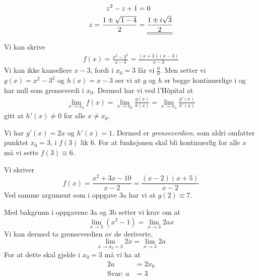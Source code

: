 \documentclass[a4paper,norsk,12pt]{article}
\begin{document}
\begin{equation*}
\begin{split}
  z^2 - z + 1 & = 0 \\
  z = \frac{1 \pm \sqrt{1-4}}{2}
  & = {\underline{\underline{\frac{1 \pm i\sqrt{3}}{2}}}}
\end{split}
\end{equation*}

Vi kan skrive
\begin{equation*}
\begin{split}
  f(x) = \frac{x^2-3^2}{x-3} = \frac{(x+3)(x-3)}{x-3}
\end{split}
\end{equation*}
Vi kan ikke kansellere $x-3$, fordi i $x_0=3$ får vi
$\frac{0}{0}$. Men setter vi $g(x)=x^2-3^2$ og $h(x)=x-3$ ser vi at $g$ og $h$
er begge kontinuerlige i og har null som grenseverdi i $x_0$. Dermed har vi ved
l'Hôpital at
\begin{equation*}
\begin{split}
  \lim_{x\to x_0}{f(x)} =
  \lim_{x\to x_0}{\frac{g(x)}{h(x)}} =
  \lim_{x\to x_0}{\frac{g'(x)}{h'(x)}}
\end{split}
\end{equation*}
gitt at $h'(x) \neq 0$ for alle $x \neq x_0$.

Vi har $g'(x) = 2x$ og $h'(x) = 1$. Dermed er \textit{grenseverdien}, som aldri
omfatter punktet $x_0=3$, i $f(3)$
lik $6$. For at funksjonen skal bli kontinuerlig for alle $x$ må vi sette
$f(3) \equiv 6$.

Vi skriver
\begin{equation*}
  f(x) = \frac{x^2+3x-10}{x-2} = \frac{(x-2)(x+5)}{x-2}
\end{equation*}
Ved samme argument som i oppgave 3a har vi at $g(2) \equiv 7$.

Med bakgrunn i oppgavene 3a og 3b setter vi krav om at
\begin{equation*}
  \lim_{x\to 3}{(x^2-1)} = \lim_{x\to 3}{2ax}
\end{equation*}
Vi kan dermed ta grenseverdien av de deriverte,
\begin{equation*}
  \lim_{x\to x_0=3}{2x} = \lim_{x\to 3}{2a}
\end{equation*}
For at dette skal gjelde i $x_0=3$ må vi ha at
\begin{equation*}
  \begin{split}
    2a & = 2x_0 \\
    \text{Svar: } a & = 3 \\
  \end{split}
\end{equation*}
\end{document}
